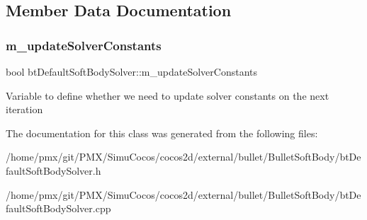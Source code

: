 \subsection{Member Data Documentation}
\mbox{\label{classbtDefaultSoftBodySolver_aa1801fb689244551e8ab11bf98eadc5f}} 
\subsubsection{\texorpdfstring{m\+\_\+update\+Solver\+Constants}{m\_updateSolverConstants}}
{\footnotesize\ttfamily bool bt\+Default\+Soft\+Body\+Solver\+::m\+\_\+update\+Solver\+Constants\hspace{0.3cm}{\ttfamily [protected]}}

Variable to define whether we need to update solver constants on the next iteration 

The documentation for this class was generated from the following files\+:\begin{DoxyCompactItemize}
\item 
/home/pmx/git/\+P\+M\+X/\+Simu\+Cocos/cocos2d/external/bullet/\+Bullet\+Soft\+Body/bt\+Default\+Soft\+Body\+Solver.\+h\item 
/home/pmx/git/\+P\+M\+X/\+Simu\+Cocos/cocos2d/external/bullet/\+Bullet\+Soft\+Body/bt\+Default\+Soft\+Body\+Solver.\+cpp\end{DoxyCompactItemize}
